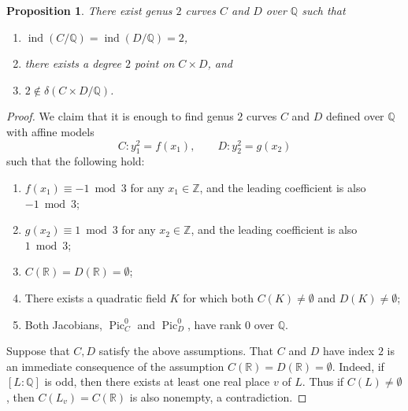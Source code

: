\documentclass[a4paper,11pt]{amsart}
\theoremstyle{plain}
\newtheorem{prop}[thm]{Proposition}
\theoremstyle{remark}
\newcommand{\bQ}{\mathbb{Q}}
\newcommand{\bR}{\mathbb{R}}
\newcommand{\Pic}{\operatorname{Pic}}
\newcommand{\dendegs}{\delta}
\newcommand{\ind}{\operatorname{ind}}
\begin{document}
\begin{prop} \label{prop: 2notindelta}
    There exist genus $2$ curves $C$ and $D$ over $\bQ$ such that
    \begin{enumerate}
        \item $\ind(C/\mathbb{Q}) = \ind(D/\mathbb{Q})=2$,
        \item there exists a degree $2$ point on $C\times D$, and
        \item $2\notin \dendegs(C\times D/\mathbb{Q})$.
    \end{enumerate}
\end{prop}
\begin{proof}
   We claim that it is enough to find genus $2$ curves $C$ and $D$ defined over $\mathbb{Q}$ with affine models
    \[
        C: y_1^2=f(x_1),\quad \quad D: y_2^2=g(x_2)
    \]
    such that the following hold:
    \begin{enumerate}
        \item[(i)] $f(x_1) \equiv -1 \bmod 3$ for any $x_1 \in \mathbb{Z}$, and the leading coefficient is also $-1 \bmod 3$;
        \item[(ii)] $g(x_2) \equiv 1 \bmod 3$ for any $x_2 \in \mathbb{Z}$, and the leading coefficient is also $1 \bmod 3$;
        \item[(iii)] $C(\mathbb{R}) = D(\mathbb{R}) = \emptyset$;
        \item[(iv)] There exists a quadratic field $K$ for which both $C(K) \neq \emptyset$ and $D(K) \neq \emptyset$;
        \item[(v)] Both Jacobians, $\Pic^0_C$ and $\Pic^0_D$, have rank 0 over $\mathbb{Q}$.
    \end{enumerate} 
    
Suppose that $C, D$ satisfy the above assumptions. 
That $C$ and $D$ have index $2$ is an immediate consequence of the assumption $C(\bR)=D(\bR)=\emptyset$. Indeed, if $[L:\mathbb{Q}]$ is odd, then there exists at least one real place $v$ of $L$. Thus if $C(L) \ne \emptyset$, then $C(L_v)=C(\mathbb{R})$ is also nonempty, a contradiction.


\end{proof}
\end{document}
